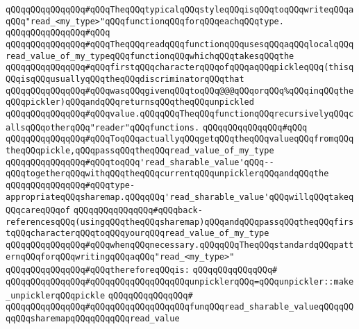 \newline
\newline
\newline
\verb|qQQqqQQqqQQqqQQq#qQQqTheqQQqtypicalqQQqstyleqQQqisqQQqtoqQQqwriteqQQqaqQQq"read_<my_type>"qQQqfunctionqQQqforqQQqeachqQQqtype.|\newline
\verb|qQQqqQQqqQQqqQQq#qQQq|\newline
\verb|qQQqqQQqqQQqqQQq#qQQqTheqQQqreadqQQqfunctionqQQqusesqQQqaqQQqlocalqQQqread_value_of_my_typeqQQqfunctionqQQqwhichqQQqtakesqQQqthe|\newline
\verb|qQQqqQQqqQQqqQQq#qQQqfirstqQQqcharacterqQQqofqQQqaqQQqpickleqQQq(thisqQQqisqQQqusuallyqQQqtheqQQqdiscriminatorqQQqthat|\newline
\verb|qQQqqQQqqQQqqQQq#qQQqwasqQQqgivenqQQqtoqQQq@@@qQQqorqQQq%qQQqinqQQqtheqQQqpickler)qQQqandqQQqreturnsqQQqtheqQQqunpickled|\newline
\verb|qQQqqQQqqQQqqQQq#qQQqvalue.qQQqqQQqTheqQQqfunctionqQQqrecursivelyqQQqcallsqQQqotherqQQq"reader"qQQqfunctions.|\newline
\verb|qQQqqQQqqQQqqQQq#qQQq|\newline
\verb|qQQqqQQqqQQqqQQq#qQQqToqQQqactuallyqQQqgetqQQqtheqQQqvalueqQQqfromqQQqtheqQQqpickle,qQQqpassqQQqtheqQQqread_value_of_my_type|\newline
\verb|qQQqqQQqqQQqqQQq#qQQqtoqQQq'read_sharable_value'qQQq--qQQqtogetherqQQqwithqQQqtheqQQqcurrentqQQqunpicklerqQQqandqQQqthe|\newline
\verb|qQQqqQQqqQQqqQQq#qQQqtype-appropriateqQQqsharemap.qQQqqQQq'read_sharable_value'qQQqwillqQQqtakeqQQqcareqQQqof|\newline
\verb|qQQqqQQqqQQqqQQq#qQQqback-referencesqQQq(usingqQQqtheqQQqsharemap)qQQqandqQQqpassqQQqtheqQQqfirstqQQqcharacterqQQqtoqQQqyourqQQqread_value_of_my_type|\newline
\verb|qQQqqQQqqQQqqQQq#qQQqwhenqQQqnecessary.qQQqqQQqTheqQQqstandardqQQqpatternqQQqforqQQqwritingqQQqaqQQq"read_<my_type>"|\newline
\verb|qQQqqQQqqQQqqQQq#qQQqthereforeqQQqis:|\newline
\verb|qQQqqQQqqQQqqQQq#|\newline
\verb|qQQqqQQqqQQqqQQq#qQQqqQQqqQQqqQQqqQQqunpicklerqQQq=qQQqunpickler::make_unpicklerqQQqpickle|\newline
\verb|qQQqqQQqqQQqqQQq#|\newline
\verb|qQQqqQQqqQQqqQQq#qQQqqQQqqQQqqQQqqQQqfunqQQqread_sharable_valueqQQqqQQqqQQqsharemapqQQqqQQqqQQqread_value|\newline
